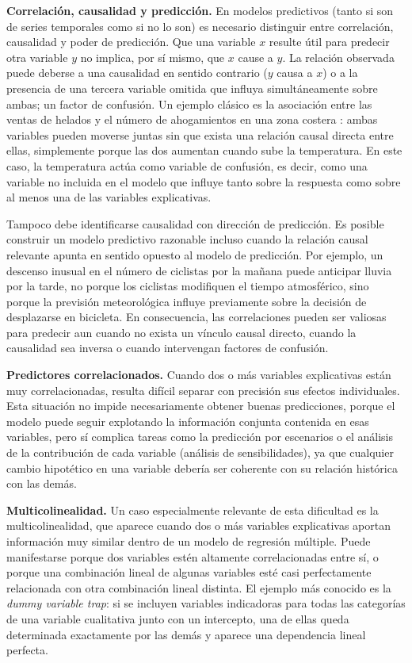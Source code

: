 \documentclass[12pt]{report} %
\begin{document}
\textbf{Correlación, causalidad y predicción.} En modelos predictivos (tanto si son de series temporales como si no lo son) es necesario distinguir entre correlación, causalidad y poder de predicción. Que una variable $x$ resulte útil para predecir otra variable $y$ no implica, por sí mismo, que $x$ cause a $y$. La relación observada puede deberse a una causalidad en sentido contrario ($y$ causa a $x$) o a la presencia de una tercera variable omitida que influya simultáneamente sobre ambas; un factor de confusión. Un ejemplo clásico es la asociación entre las ventas de helados y el número de ahogamientos en una zona costera \cite{pearl2017}: ambas variables pueden moverse juntas sin que exista una relación causal directa entre ellas, simplemente porque las dos aumentan cuando sube la temperatura. En este caso, la temperatura actúa como variable de confusión, es decir, como una variable no incluida en el modelo que influye tanto sobre la respuesta como sobre al menos una de las variables explicativas.

Tampoco debe identificarse causalidad con dirección de predicción. Es posible construir un modelo predictivo razonable incluso cuando la relación causal relevante apunta en sentido opuesto al modelo de predicción. Por ejemplo, un descenso inusual en el número de ciclistas por la mañana puede anticipar lluvia por la tarde, no porque los ciclistas modifiquen el tiempo atmosférico, sino porque la previsión meteorológica influye previamente sobre la decisión de desplazarse en bicicleta. En consecuencia, las correlaciones pueden ser valiosas para predecir aun cuando no exista un vínculo causal directo, cuando la causalidad sea inversa o cuando intervengan factores de confusión.

\textbf{Predictores correlacionados.} Cuando dos o más variables explicativas están muy correlacionadas, resulta difícil separar con precisión sus efectos individuales. Esta situación no impide necesariamente obtener buenas predicciones, porque el modelo puede seguir explotando la información conjunta contenida en esas variables, pero sí complica tareas como la predicción por escenarios o el análisis de la contribución de cada variable (análisis de sensibilidades), ya que cualquier cambio hipotético en una variable debería ser coherente con su relación histórica con las demás.

\textbf{Multicolinealidad.} Un caso especialmente relevante de esta dificultad es la multicolinealidad, que aparece cuando dos o más variables explicativas aportan información muy similar dentro de un modelo de regresión múltiple. Puede manifestarse porque dos variables estén altamente correlacionadas entre sí, o porque una combinación lineal de algunas variables esté casi perfectamente relacionada con otra combinación lineal distinta. El ejemplo más conocido es la \textit{dummy variable trap}: si se incluyen variables indicadoras para todas las categorías de una variable cualitativa junto con un intercepto, una de ellas queda determinada exactamente por las demás y aparece una dependencia lineal perfecta.
\end{document}
